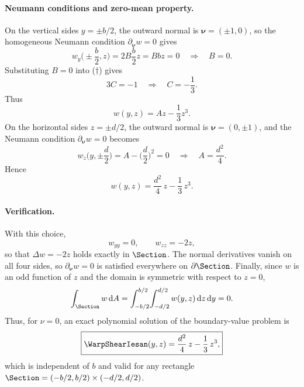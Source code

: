 \paragraph{Neumann conditions and zero-mean property.}
On the vertical sides $y=\pm b/2$, the outward normal is $\bm\nu=(\pm 1,0)$, so the homogeneous Neumann condition $\partial_{\bm\nu}w=0$ gives
\[
w_y\Big(\pm\frac b2,z\Big) = 2B\frac b2 z = Bb z = 0
\quad\Rightarrow\quad B=0.
\]
Substituting $B=0$ into ($\dagger$) gives
\[
3C = -1 \quad\Rightarrow\quad C=-\frac13.
\]
Thus
\[
w(y,z) = A z - \frac{1}{3}z^3.
\]
On the horizontal sides $z=\pm d/2$, the outward normal is $\bm\nu=(0,\pm 1)$, and the Neumann condition $\partial_{\bm\nu}w=0$ becomes
\[
w_z\Big(y,\pm\frac d2\Big) = A - \Big(\frac d2\Big)^2 = 0
\quad\Rightarrow\quad
A = \frac{d^2}{4}.
\]
Hence
\[
w(y,z) = \frac{d^2}{4}\,z - \frac{1}{3}\,z^3.
\]

\paragraph{Verification.}
With this choice,
\[
w_{yy}=0,\qquad w_{zz} = -2z,
\]
so that $\Delta w = -2z$ holds exactly in $\Section$. The normal derivatives vanish on all four sides, so $\partial_{\bm\nu}w=0$ is satisfied everywhere on $\partial\Section$. Finally, since $w$ is an odd function of $z$ and the domain is symmetric with respect to $z=0$,
\[
\int_\Section w\,\mathrm dA
= \int_{-b/2}^{b/2}\!\int_{-d/2}^{d/2} w(y,z)\,\mathrm dz\,\mathrm dy = 0.
\]
Thus, for $\nu=0$, an exact polynomial solution of the boundary-value problem is
\[
\boxed{
\WarpShearIesan(y,z)
= \frac{d^2}{4}\,z - \frac{1}{3}\,z^3,
}
\]
which is independent of $b$ and valid for any rectangle $\Section=(-b/2,b/2)\times(-d/2,d/2)$.
